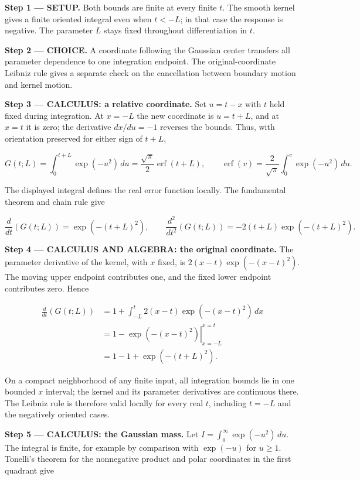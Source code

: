 \documentclass[11pt,oneside,openany]{book}
\begin{document}
\textbf{Step 1 --- SETUP.} Both bounds are finite at every finite \(t\). The smooth kernel gives a finite oriented integral even when \(t<-L\); in that case the response is negative. The parameter \(L\) stays fixed throughout differentiation in \(t\).

\begin{ChoiceStep}
\textbf{Step 2 --- CHOICE.} A coordinate following the Gaussian center transfers all parameter dependence to one integration endpoint. The original-coordinate Leibniz rule gives a separate check on the cancellation between boundary motion and kernel motion.

\end{ChoiceStep}
\textbf{Step 3 --- CALCULUS: a relative coordinate.} Set \(u=t-x\) with \(t\) held fixed during integration. At \(x=-L\) the new coordinate is \(u=t+L\), and at \(x=t\) it is zero; the derivative \(dx/du=-1\) reverses the bounds. Thus, with orientation preserved for either sign of \(t+L\),

\[
G(t;L)=\int_0^{t+L}\exp(-u^2)\,du
=\frac{\sqrt\pi}{2}\operatorname{erf}(t+L),
\qquad
\operatorname{erf}(v)=\frac{2}{\sqrt\pi}\int_0^v\exp(-u^2)\,du.
\]

The displayed integral defines the real error function locally. The fundamental theorem and chain rule give

\[
\frac{d}{dt}(G(t;L))=\exp(-(t+L)^2),\qquad
\frac{d^2}{dt^2}(G(t;L))=-2(t+L)\exp(-(t+L)^2).
\]

\textbf{Step 4 --- CALCULUS AND ALGEBRA: the original coordinate.} The parameter derivative of the kernel, with \(x\) fixed, is \(2(x-t)\exp(-(x-t)^2)\). The moving upper endpoint contributes one, and the fixed lower endpoint contributes zero. Hence

\[
\begin{aligned}
\frac{d}{dt}(G(t;L))
&=1+\int_{-L}^t2(x-t)\exp(-(x-t)^2)\,dx\\
&=1-\left.\exp(-(x-t)^2)\right|_{x=-L}^{x=t}\\
&=1-1+\exp(-(t+L)^2).
\end{aligned}
\]

On a compact neighborhood of any finite input, all integration bounds lie in one bounded \(x\) interval; the kernel and its parameter derivatives are continuous there. The Leibniz rule is therefore valid locally for every real \(t\), including \(t=-L\) and the negatively oriented cases.

\textbf{Step 5 --- CALCULUS: the Gaussian mass.} Let \(I=\int_0^\infty\exp(-u^2)\,du\). The integral is finite, for example by comparison with \(\exp(-u)\) for \(u\ge1\). Tonelli's theorem for the nonnegative product and polar coordinates in the first quadrant give
\end{document}
